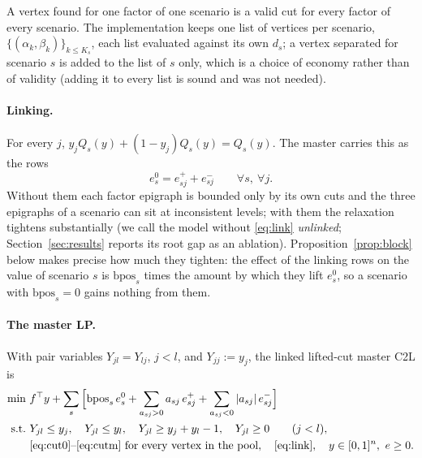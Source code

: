 \documentclass[11pt]{article}
\newcommand{\bpos}{\mathrm{bpos}}
\newcommand{\T}{^{\top}}
\begin{document}
A vertex found for one factor of one scenario is a valid cut for every factor of every scenario. The implementation
keeps one list of vertices per scenario, $\{(\alpha_k,\beta_k)\}_{k\le K_s}$, each list evaluated against its own
$d_s$; a vertex separated for scenario $s$ is added to the list of $s$ only, which is a choice of economy rather than
of validity (adding it to every list is sound and was not needed).

\paragraph{Linking.} For every $j$, $y_jQ_s(y) + (1-y_j)Q_s(y) = Q_s(y)$. The master carries this as the rows
\begin{equation}\label{eq:link}
e^0_s = e^+_{sj} + e^-_{sj}\qquad \forall s,\ \forall j.
\end{equation}
Without them each factor epigraph is bounded only by its own cuts and the three epigraphs of a scenario can sit at
inconsistent levels; with them the relaxation tightens substantially (we call the model without \eqref{eq:link}
\emph{unlinked}; Section~\ref{sec:results} reports its root gap as an ablation). Proposition~\ref{prop:block} below
makes precise how much they tighten: the effect of the linking rows on the value of scenario $s$ is
$\bpos_s$ times the amount by which they lift $e^0_s$, so a scenario with $\bpos_s = 0$ gains nothing from them.

\paragraph{The master LP.} With pair variables $Y_{jl} = Y_{lj}$, $j<l$, and $Y_{jj} := y_j$, the linked lifted-cut
master \textsc{C2L} is
\begin{equation}\label{eq:c2l}
\begin{aligned}
\min\ & f\T y + \sum_s \Big[\bpos_s\, e^0_s + \sum_{a_{sj}>0} a_{sj}\,e^+_{sj} + \sum_{a_{sj}<0}|a_{sj}|\,e^-_{sj}\Big]\\
\text{s.t.}\ & Y_{jl}\le y_j,\quad Y_{jl}\le y_l,\quad Y_{jl}\ge y_j+y_l-1,\quad Y_{jl}\ge 0 \qquad (j<l),\\
& \text{\eqref{eq:cut0}--\eqref{eq:cutm} for every vertex in the pool},\quad \eqref{eq:link},\quad
y\in[0,1]^n,\ e\ge 0 .
\end{aligned}
\end{equation}
\end{document}
